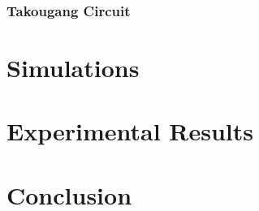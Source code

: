 \newpage
\subsubsection{Takougang Circuit}


\newpage
\section{Simulations}


\newpage
\section{Experimental Results}


\section{Conclusion}

